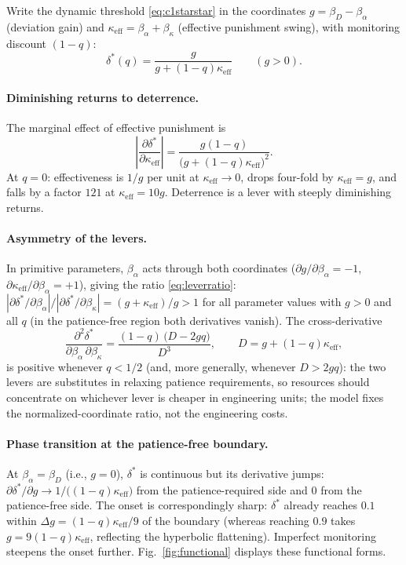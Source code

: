 \documentclass[manuscript,screen,review]{jair}
\begin{document}
Write the dynamic threshold \eqref{eq:c1starstar} in the coordinates $g = \beta_D - \beta_\alpha$ (deviation gain) and $\kappa_{\mathrm{eff}} = \beta_\alpha + \beta_\kappa$ (effective punishment swing), with monitoring discount $(1-q)$:
\begin{equation*}
\delta^*(q) = \frac{g}{g + (1-q)\kappa_{\mathrm{eff}}}\qquad (g > 0).
\end{equation*}

\paragraph{Diminishing returns to deterrence.}
The marginal effect of effective punishment is
\begin{equation*}
\left|\frac{\partial \delta^*}{\partial \kappa_{\mathrm{eff}}}\right| = \frac{g(1-q)}{\bigl(g+(1-q)\kappa_{\mathrm{eff}}\bigr)^2}.
\end{equation*}
At $q=0$: effectiveness is $1/g$ per unit at $\kappa_{\mathrm{eff}}\to 0$, drops four-fold by $\kappa_{\mathrm{eff}} = g$, and falls by a factor $121$ at $\kappa_{\mathrm{eff}} = 10g$. Deterrence is a lever with steeply diminishing returns.

\paragraph{Asymmetry of the levers.}
In primitive parameters, $\beta_\alpha$ acts through both coordinates ($\partial g/\partial\beta_\alpha = -1$, $\partial\kappa_{\mathrm{eff}}/\partial\beta_\alpha = +1$), giving the ratio \eqref{eq:leverratio}: $|\partial\delta^*/\partial\beta_\alpha| / |\partial\delta^*/\partial\beta_\kappa| = (g+\kappa_{\mathrm{eff}})/g > 1$ for all parameter values with $g > 0$ and all $q$ (in the patience-free region both derivatives vanish). The cross-derivative
\begin{equation*}
\frac{\partial^2 \delta^*}{\partial\beta_\alpha\,\partial\beta_\kappa} = \frac{(1-q)\,\bigl(D - 2gq\bigr)}{D^3}, \qquad D = g + (1-q)\kappa_{\mathrm{eff}},
\end{equation*}
is positive whenever $q < 1/2$ (and, more generally, whenever $D > 2gq$): the two levers are substitutes in relaxing patience requirements, so resources should concentrate on whichever lever is cheaper in engineering units; the model fixes the normalized-coordinate ratio, not the engineering costs.

\paragraph{Phase transition at the patience-free boundary.}
At $\beta_\alpha = \beta_D$ (i.e., $g=0$), $\delta^*$ is continuous but its derivative jumps: $\partial\delta^*/\partial g \to 1/\bigl((1-q)\kappa_{\mathrm{eff}}\bigr)$ from the patience-required side and $0$ from the patience-free side. The onset is correspondingly sharp: $\delta^*$ already reaches $0.1$ within $\Delta g = (1-q)\kappa_{\mathrm{eff}}/9$ of the boundary (whereas reaching $0.9$ takes $g = 9(1-q)\kappa_{\mathrm{eff}}$, reflecting the hyperbolic flattening). Imperfect monitoring steepens the onset further. Fig.~\ref{fig:functional} displays these functional forms.
\end{document}
